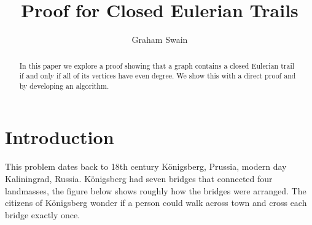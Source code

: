 \documentclass[10pt]{amsart}
\begin{document}
\parskip10pt
\parindent12pt
\baselineskip16pt






\def\G{\widetilde{G}}
\def\B{\widetilde{B}}
\def\T{\widetilde{T}}
\def\C{\mathbb{C}}
\def\A{\mathbb{A}}
\def\Z{\mathbb{Z}}
\def\R{\mathbb{R}}
\def\Q{\mathbb{Q}}
\def\N{\mathbb{N}}
\def\C{\mathbb{C}}
\def\F{\mathbb{F}}
\def\I{\mathbb{I}}
\def\H{\mathcal{H}}
\def\e{\varepsilon}
\def\s{\underline s}
\def\z{\zeta }
\def\vp{\varpi }
\def\O{\mathcal O}
\def\v{\upsilon }
\def\U{\Upsilon }
\def\p{\wp }
\def\p{\mathfrak{p}}
\def\B{\mathfrak{B}}

\newtheorem{theorem}{Theorem}%
\newtheorem{lemma}[theorem]{Lemma}


\title{Proof for Closed Eulerian Trails}

\author{Graham Swain}




\begin{abstract}
In this paper we explore a proof showing that a graph contains a closed Eulerian trail if and only if
all of its vertices have even degree. We show this with a direct proof and by developing an algorithm.
\end{abstract}

\maketitle





\section{Introduction}

This problem dates back to 18th century K\"{o}nigsberg, Prussia, modern day Kaliningrad, Russia. 
K\"{o}nigsberg had seven bridges that connected four landmasses, the figure below shows roughly 
how the bridges were arranged. The citizens of K\"{o}nigsberg wonder if a person could walk across 
town and cross each bridge exactly once.
\end{document}
